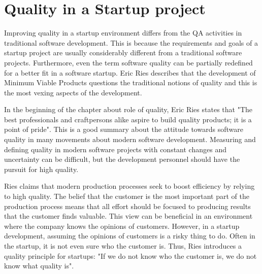 


 \section{Quality in a Startup project}

Improving quality in a startup environment differs from the QA activities in traditional software development. This is because the requirements and goals of a startup project are usually considerably different from a traditional software projects. Furthermore, even the term software quality can be partially redefined for a better fit in a software startup. Eric Ries describes that the development of Minimum Viable Products questions the traditional notions of quality and this is the most vexing aspects of the development.~\cite{ries2011lean}

In the beginning of the chapter about role of quality, Eric Ries states that "The best professionals and craftpersons alike aspire to build quality products; it is a point of pride". This is a good summary about the attitude towards software quality in many movements about modern software development. Measuring and defining quality in modern software projects with constant changes and uncertainty can be difficult, but the development personnel should have the pursuit for high quality.~\cite{ries2011lean}

Ries claims that modern production processes seek to boost efficiency by relying to high quality. The belief that the customer is the most important part of the production process means that all effort should be focused to producing results that the customer finds valuable. This view can be beneficial in an environment where the company knows the opinions of customers. However, in a startup development, assuming the opinions of customers is a risky thing to do. Often in the startup, it is not even sure who the customer is. Thus, Ries introduces a quality principle for startups: "If we do not know who the customer is, we do not know what quality is".~\cite{ries2011lean}

